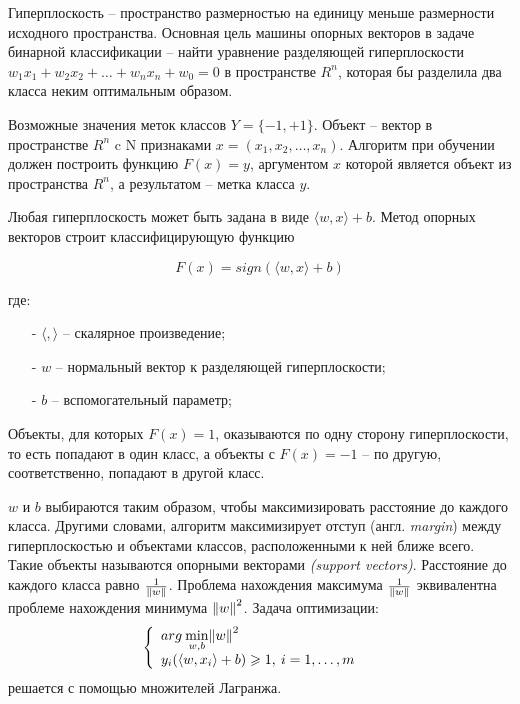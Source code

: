 Гиперплоскость -- пространство размерностью на единицу меньше размерности исходного пространства.
Основная цель машины опорных векторов в задаче бинарной классификации -- найти уравнение разделяющей гиперплоскости $w_1x_1+w_2x_2+…+w_nx_n+w_0=0$ 
в пространстве $R^n$, которая бы разделила два класса неким оптимальным образом. 

Возможные значения меток классов $Y = \{-1, +1\}$. Объект -- вектор в пространстве $R^n$ c 
N признаками $x = (x_1, x_2, \dots, x_n)$. Алгоритм при обучении должен построить функцию 
$F(x)=y$, аргументом $x$ которой является объект из пространства $R^n$, а результатом -- метка класса $y$.

Любая гиперплоскость может быть задана в виде $\langle w, x \rangle + b$.
Метод опорных векторов строит классифицирующую функцию

\begin{equation}\label{eq5}
    F(x) = sign(\langle w, x \rangle + b)
\end{equation}

где: 
\begin{itemize}
    \item[-] $\langle , \rangle$ -- скалярное произведение;
    \item[-] $w$ -- нормальный вектор к разделяющей гиперплоскости;
    \item[-] $b$ -- вспомогательный параметр;
\end{itemize}

Объекты, для которых $F(x) = 1$, оказываются по одну сторону гиперплоскости, 
то есть попадают в один класс, а объекты с $F(x) = -1$ -- по другую, соответственно, 
попадают в другой класс.

$w$ и $b$ выбираются таким образом, чтобы максимизировать расстояние до каждого класса. 
Другими словами, алгоритм максимизирует отступ (англ. \emph{margin}) между гиперплоскостью 
и объектами классов, расположенными к ней ближе всего. Такие объекты называются опорными векторами \emph{(support vectors)}.
Расстояние до каждого класса равно $\frac {1}{\Arrowvert w \Arrowvert}$. Проблема нахождения максимума 
$\frac {1}{\Arrowvert w \Arrowvert}$ эквивалентна проблеме нахождения минимума ${\Arrowvert w \Arrowvert}^2$. 
Задача оптимизации:
\begin{equation}\label{eq6}
    \left\{ \begin{array}{ll} arg \: \underset{w,b}{\min} {\Arrowvert w \Arrowvert}^2 & \textrm{}\\ y_i(\langle w,x_i \rangle + b) \geqslant 1, \: i = 1, \dots, m \end{array} \right.
\end{equation}
решается с помощью множителей Лагранжа.


